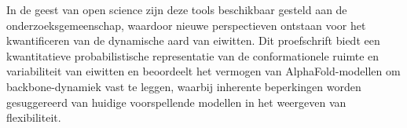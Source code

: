 In de geest van open science zijn deze tools beschikbaar gesteld aan de onderzoeksgemeenschap, waardoor nieuwe perspectieven ontstaan voor het kwantificeren van de dynamische aard van eiwitten. Dit proefschrift biedt een kwantitatieve probabilistische representatie van de conformationele ruimte en variabiliteit van eiwitten en beoordeelt het vermogen van AlphaFold-modellen om backbone-dynamiek vast te leggen, waarbij inherente beperkingen worden gesuggereerd van huidige voorspellende modellen in het weergeven van flexibiliteit.